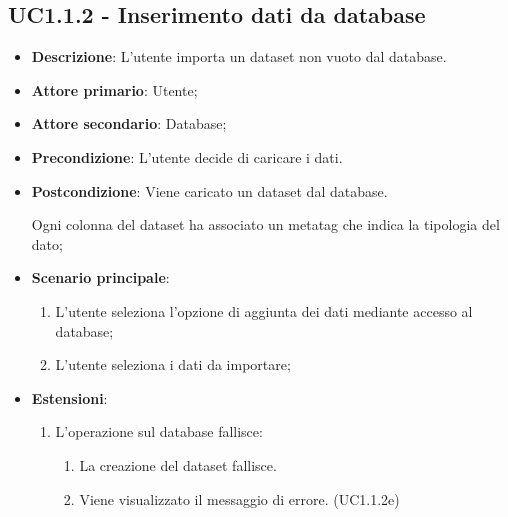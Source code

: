 \subsection{UC1.1.2 - Inserimento dati da database}
\begin{itemize}
    \item \textbf{Descrizione}: L'utente importa un dataset non vuoto dal database.

    \item \textbf{Attore primario}: Utente;
    
    \item \textbf{Attore secondario}: Database; 
    
    \item \textbf{Precondizione}:   L'utente decide di caricare i dati.

    \item \textbf{Postcondizione}:  Viene caricato un dataset dal database. 

                                    Ogni colonna del dataset ha associato
                                    un metatag che indica la tipologia del dato;

	\item \textbf{Scenario principale}:
		\begin{enumerate}
			\item L'utente seleziona l'opzione di aggiunta dei dati mediante accesso al database;
			\item L'utente seleziona i dati da importare;
        \end{enumerate}

    \item \textbf{Estensioni}:
        \begin{enumerate}
            \item L'operazione sul database fallisce:
            \begin{enumerate}
                \item La creazione del dataset fallisce.
                \item Viene visualizzato il messaggio di errore. (UC1.1.2e)
            \end{enumerate}  
         \end{enumerate}
\end{itemize}



